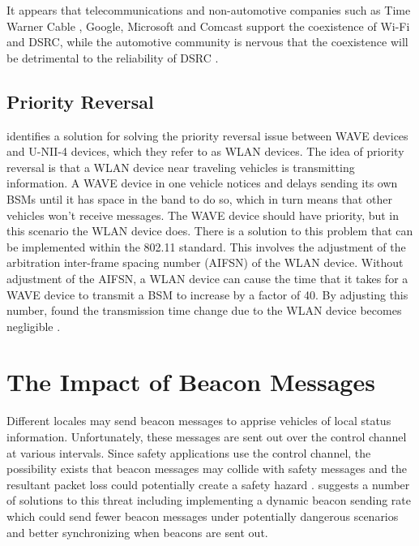 \documentclass[twoside,conference]{IEEEtran}
\begin{document}
		 It appears that telecommunications and non-automotive companies such as Time Warner Cable \cite[p. 13--14]{TWC2013}, Google, Microsoft \cite[p. 11]{MicrosoftGoogle2013} and Comcast \cite[p. 30]{Comcast2013} support the coexistence of Wi-Fi and DSRC, while the automotive community is nervous that the coexistence will be detrimental to the reliability of DSRC \cite[p. 16]{Toyota2013}.
		 
		 \subsection{Priority Reversal}
		 \cite{Park2014} identifies a solution for solving the priority reversal issue between WAVE devices and U-NII-4 devices, which they refer to as WLAN devices.  The idea of priority reversal is that a WLAN device near traveling vehicles is transmitting information.  A WAVE device in one vehicle notices and delays sending its own BSMs until it has space in the band to do so, which in turn means that other vehicles won't receive messages.  The WAVE device should have priority, but in this scenario the WLAN device does.  There is a solution to this problem that can be implemented within the 802.11 standard.  This involves the adjustment of the arbitration inter-frame spacing number (AIFSN) of the WLAN device.  Without adjustment of the AIFSN, a WLAN device can cause the time that it takes for a WAVE device to transmit a BSM to increase by a factor of 40.  By adjusting this number, found the transmission time change due to the WLAN device becomes negligible \cite[p. 165]{Park2014}.
		 
		
\section{The Impact of Beacon Messages}\label{sec:beacons}
		Different locales may send beacon messages to apprise vehicles of local status information. Unfortunately, these messages are sent out over the control channel at various intervals. Since safety applications use the control channel, the possibility exists that beacon messages may collide with safety messages and the resultant packet loss could potentially create a safety hazard \cite{Doukha2015}. \cite{Doukha2015} suggests a number of solutions to this threat including implementing a dynamic beacon sending rate which could send fewer beacon messages under potentially dangerous scenarios and better synchronizing when beacons are sent out.
\end{document}
